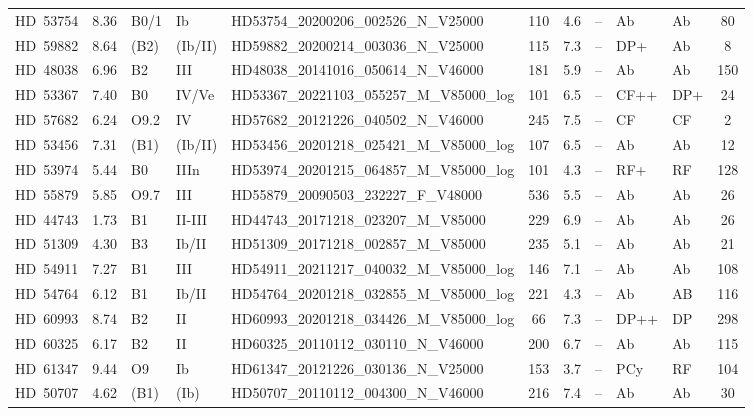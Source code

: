 {\begin{landscape}
\begin{longtable}{lclllcclllc}
\noalign{\smallskip}
HD~53754 & 8.36 & B0/1 & Ib & HD53754\_20200206\_002526\_N\_V25000 & 110 & 4.6 & -- & Ab & Ab & 80 \\
\noalign{\smallskip}
HD~59882 & 8.64 & (B2) & (Ib/II) & HD59882\_20200214\_003036\_N\_V25000 & 115 & 7.3 & -- & DP+ & Ab & 8 \\
\noalign{\smallskip}
HD~48038 & 6.96 & B2 & III & HD48038\_20141016\_050614\_N\_V46000 & 181 & 5.9 & -- & Ab & Ab & 150 \\
\noalign{\smallskip}
HD~53367 & 7.40 & B0 & IV/Ve & HD53367\_20221103\_055257\_M\_V85000\_log & 101 & 6.5 & -- & CF++ & DP+ & 24 \\
\noalign{\smallskip}
HD~57682 & 6.24 & O9.2 & IV & HD57682\_20121226\_040502\_N\_V46000 & 245 & 7.5 & -- & CF & CF & 2 \\
\noalign{\smallskip}
HD~53456 & 7.31 & (B1) & (Ib/II) & HD53456\_20201218\_025421\_M\_V85000\_log & 107 & 6.5 & -- & Ab & Ab & 12 \\
\noalign{\smallskip}
HD~53974 & 5.44 & B0 & IIIn & HD53974\_20201215\_064857\_M\_V85000\_log & 101 & 4.3 & -- & RF+ & RF & 128 \\
\noalign{\smallskip}
HD~55879 & 5.85 & O9.7 & III & HD55879\_20090503\_232227\_F\_V48000 & 536 & 5.5 & -- & Ab & Ab & 26 \\
\noalign{\smallskip}
HD~44743 & 1.73 & B1 & II-III & HD44743\_20171218\_023207\_M\_V85000 & 229 & 6.9 & -- & Ab & Ab & 26 \\
\noalign{\smallskip}
HD~51309 & 4.30 & B3 & Ib/II & HD51309\_20171218\_002857\_M\_V85000 & 235 & 5.1 & -- & Ab & Ab & 21 \\
\noalign{\smallskip}
HD~54911 & 7.27 & B1 & III & HD54911\_20211217\_040032\_M\_V85000\_log & 146 & 7.1 & -- & Ab & Ab & 108 \\
\noalign{\smallskip}
HD~54764 & 6.12 & B1 & Ib/II & HD54764\_20201218\_032855\_M\_V85000\_log & 221 & 4.3 & -- & Ab & AB & 116 \\
\noalign{\smallskip}
HD~60993 & 8.74 & B2 & II & HD60993\_20201218\_034426\_M\_V85000\_log & 66 & 7.3 & -- & DP++ & DP & 298 \\
\noalign{\smallskip}
HD~60325 & 6.17 & B2 & II & HD60325\_20110112\_030110\_N\_V46000 & 200 & 6.7 & -- & Ab & Ab & 115 \\
\noalign{\smallskip}
HD~61347 & 9.44 & O9 & Ib & HD61347\_20121226\_030136\_N\_V25000 & 153 & 3.7 & -- & PCy & RF & 104 \\
\noalign{\smallskip}
HD~50707 & 4.62 & (B1) & (Ib) & HD50707\_20110112\_004300\_N\_V46000 & 216 & 7.4 & -- & Ab & Ab & 30 \\

\end{longtable}
\end{landscape}}
